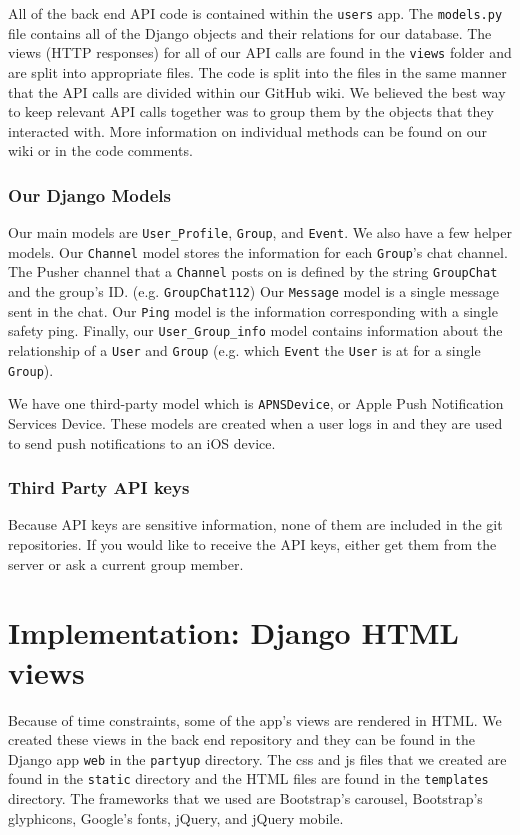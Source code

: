 \documentclass[12pt]{article}
\begin{document}
All of the back end API code is contained within the \texttt{users} app.
The \texttt{models.py} file contains all of the Django objects and their relations for our database. 
The views (HTTP responses) for all of our API calls are found in the \texttt{views} folder and are split into appropriate files.
The code is split into the files in the same manner that the API calls are divided within our GitHub wiki. 
We believed the best way to keep relevant API calls together was to group them by the objects that they interacted with. 
More information on individual methods can be found on our wiki or in the code comments.

\subsubsection{Our Django Models}

Our main models are \texttt{User\_Profile}, \texttt{Group}, and \texttt{Event}. 
We also have a few helper models. 
Our \texttt{Channel} model stores the information for each \texttt{Group}'s chat channel. 
The Pusher channel that a \texttt{Channel} posts on is defined by the string \texttt{GroupChat} and the group's ID. (e.g. \texttt{GroupChat112}) 
Our \texttt{Message} model is a single message sent in the chat. 
Our \texttt{Ping} model is the information corresponding with a single safety ping. 
Finally, our \texttt{User\_Group\_info} model contains information about the relationship of a \texttt{User} and \texttt{Group} (e.g. which \texttt{Event} the \texttt{User} is at for a single \texttt{Group}).

We have one third-party model which is \texttt{APNSDevice}, or Apple Push Notification Services Device. 
These models are created when a user logs in and they are used to send push notifications to an iOS device.

\subsubsection{Third Party API keys}

Because API keys are sensitive information, none of them are included in the git repositories. 
If you would like to receive the API keys, either get them from the server or ask a current group member.

\section{Implementation: Django HTML views}

Because of time constraints, some of the app's views are rendered in HTML. We created these views in the back end repository and they can be found in the Django app \texttt{web} in the \texttt{partyup} directory. The css and js files that we created are found in the  \texttt{static} directory and the HTML files are found in the  \texttt{templates} directory. The frameworks that we used are Bootstrap's carousel, Bootstrap's glyphicons, Google's fonts, jQuery, and jQuery mobile. 
\end{document}
